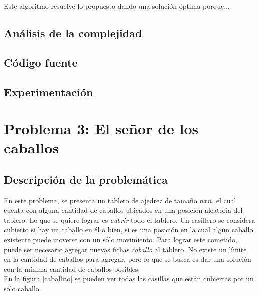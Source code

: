 \documentclass[a4paper]{article}
\begin{document}
Este algoritmo resuelve lo propuesto dando una soluci\'on \'optima porque...\\ 




\subsection{An\'alisis de la complejidad}
\subsection{C\'odigo fuente}
\subsection{Experimentaci\'on}



\newpage

\section{Problema 3: El se\~nor de los caballos}
\subsection{Descripci\'on de la problem\'atica}

En este problema, se presenta un tablero de ajedrez de tama\~no $nxn$, el cual cuenta con alguna cantidad de caballos ubicados en una posici\'on aleatoria del tablero. Lo que se quiere lograr es \emph{cubrir} todo el tablero. Un casillero se considera cubierto si hay un caballo en \'el o bien, si es una posici\'on en la cual alg\'un caballo existente puede moverse con un s\'olo movimiento. Para lograr este cometido, puede ser necesario agregar nuevas fichas \emph{caballo} al tablero. No existe un l\'imite en la cantidad de caballos para agregar, pero lo que se busca es dar una soluci\'on con la m\'inima cantidad de caballos posibles.\\


En la figura \ref{caballito} se pueden ver todas las casillas que est\'an cubiertas por un s\'olo caballo.
\end{document}
